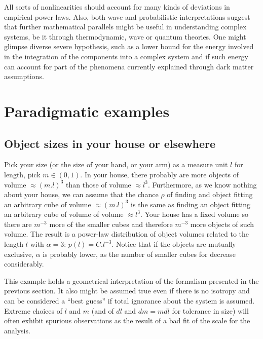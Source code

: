 \documentclass[a4paper, 11pt]{article} %
\begin{document}
All sorts of nonlinearities should account
for many kinds of deviations in empirical power laws.
Also,
both wave and probabilistic interpretations
suggest that further mathematical
parallels might be useful in understanding complex
systems, be it through thermodynamic, wave or quantum theories.
One might glimpse diverse severe hypothesis,
such as a lower bound for the energy involved in the integration of
the components into a complex system and
if such energy can account for part of the phenomena
currently explained through dark matter assumptions.

\section{Paradigmatic examples}\label{sec:par}
\subsection{Object sizes in your house or elsewhere}\label{sec:siz}
Pick your size (or the size of your hand, or your arm)
as a measure unit $l$ for length, pick $m \in (0,1)$.
In your house, there probably are more objects
of volume $\approx (m.l)^3$ 
than those of volume $\approx l^3$.
Furthermore, as we know nothing about your house,
we can assume that the chance $\rho$ of finding and object
fitting an arbitrary cube of volume $\approx (m.l)^3$
is the same as finding an object fitting an
arbitrary cube of volume of volume $\approx l^3$.
Your house has a fixed volume so there are $m^{-3}$ more of
the smaller cubes and therefore $m^{-3}$ more objects of such
volume. 
The result is a power-law distribution of object volumes
related to the length $l$ with $\alpha=3$:
$p(l)=C.l^{-3}$.
Notice that if the objects are mutually exclusive,
$\alpha$ is probably lower, as the number of smaller
cubes for decrease considerably.

This example holds a geometrical
interpretation of the formalism presented in the previous section.
It also might be assumed true even if there is no isotropy
and can be considered a ``best guess'' if total ignorance
about the system is assumed. 
Extreme choices of $l$ and $m$ (and of $dl$ and $dm=mdl$ for tolerance in size)
will often exhibit spurious observations
as the result of a bad fit of the scale for the analysis.
\end{document}
